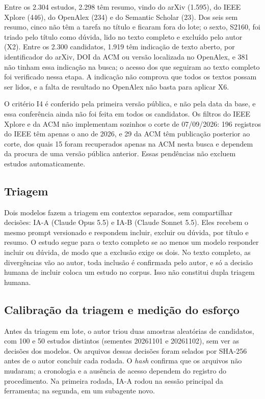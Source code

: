 Entre os 2.304 estudos, 2.298 têm resumo, vindo do arXiv (1.595), do IEEE Xplore (446), do OpenAlex
(234) e do Semantic Scholar (23). Dos seis sem resumo, cinco não têm a tarefa no título e ficaram
fora do lote; o sexto, S2160, foi triado pelo título como dúvida, lido no texto completo e excluído pelo autor (X2). Entre os 2.300 candidatos, 1.919 têm indicação de texto aberto, por
identificador do arXiv, DOI da ACM ou versão localizada no OpenAlex, e 381 não tinham essa indicação
na busca; o acesso dos que seguiram ao texto completo foi verificado nessa etapa.
A indicação não comprova que todos os textos possam ser lidos, e a falta de resultado no OpenAlex não
basta para aplicar X6.

O critério I4 é conferido pela primeira versão pública, e não pela data da base, e essa conferência
ainda não foi feita em todos os candidatos. Os filtros do IEEE Xplore e da ACM não implementam sozinhos
o corte de 07/09/2026: 196 registros do IEEE têm apenas o ano de 2026, e 29 da ACM têm publicação
posterior ao corte, dos quais 15 foram recuperados apenas na ACM nesta busca e dependem da procura de
uma versão pública anterior. Essas pendências não excluem estudos automaticamente.

\subsection{Triagem}
Dois modelos fazem a triagem em contextos separados, sem compartilhar decisões: IA-A (Claude Opus 5.5)
e IA-B (Claude Sonnet 5.5). Eles recebem o mesmo prompt versionado e respondem incluir, excluir ou
dúvida, por título e resumo. O estudo segue para o texto completo se ao menos um modelo responder
incluir ou dúvida, de modo que a exclusão exige os dois. No texto completo, as divergências vão ao
autor, toda inclusão é confirmada pelo autor, e só a decisão humana de incluir coloca um estudo no
corpus. Isso não constitui dupla triagem humana.

\subsection{Calibração da triagem e medição do esforço}\label{sec:calibracao}
Antes da triagem em lote, o autor triou duas amostras aleatórias de candidatos, com 100 e 50 estudos
distintos (sementes 20261101 e 20261102), sem ver as decisões dos modelos. Os arquivos dessas decisões
foram selados por SHA-256 antes de o autor concluir cada rodada. O \textit{hash} confirma que os arquivos
não mudaram; a cronologia e a ausência de acesso dependem do registro do procedimento. Na primeira
rodada, IA-A rodou na sessão principal da ferramenta; na segunda, em um subagente novo.

